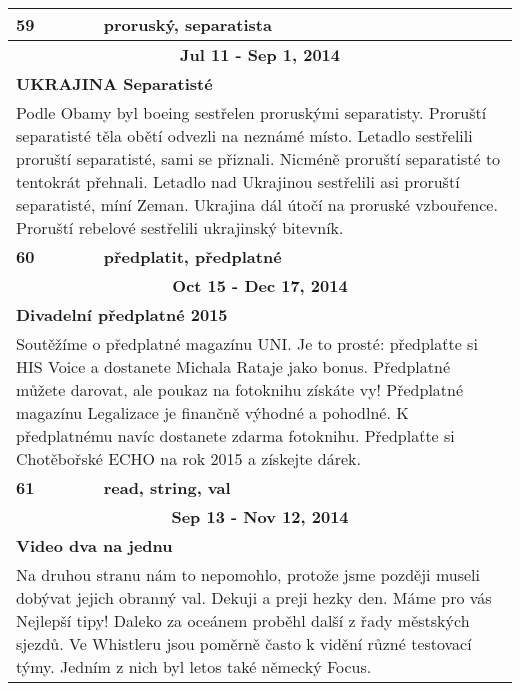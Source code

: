 \begin{tabularx}{\linewidth}{l l}
            \bf 59 & \bf proruský, separatista \\ \midrule
            
                \multicolumn{2}{c}{\bf Jul 11 - Sep 1, 2014} \\
                \multicolumn{2}{p{\linewidth}}{\bf UKRAJINA Separatisté} \\
                \multicolumn{2}{p{\linewidth}}{Podle Obamy byl boeing sestřelen proruskými separatisty. Proruští separatisté těla obětí odvezli na neznámé místo. Letadlo sestřelili proruští separatisté, sami se přiznali. Nicméně proruští separatisté to tentokrát přehnali. Letadlo nad Ukrajinou sestřelili asi proruští separatisté, míní Zeman. Ukrajina dál útočí na proruské vzbouřence. Proruští rebelové sestřelili ukrajinský bitevník.} \\ \midrule
                [1.5pt]

            \bf 60 & \bf předplatit, předplatné \\ \midrule
            
                \multicolumn{2}{c}{\bf Oct 15 - Dec 17, 2014} \\
                \multicolumn{2}{p{\linewidth}}{\bf Divadelní předplatné 2015} \\
                \multicolumn{2}{p{\linewidth}}{Soutěžíme o předplatné magazínu UNI. Je to prosté: předplaťte si HIS Voice a dostanete Michala Rataje jako bonus. Předplatné můžete darovat, ale poukaz na fotoknihu získáte vy! Předplatné magazínu Legalizace je finančně výhodné a pohodlné. K předplatnému navíc dostanete zdarma fotoknihu. Předplaťte si Chotěbořské ECHO na rok 2015 a získejte dárek.} \\ \midrule
                [1.5pt]

            \bf 61 & \bf read, string, val \\ \midrule
            
                \multicolumn{2}{c}{\bf Sep 13 - Nov 12, 2014} \\
                \multicolumn{2}{p{\linewidth}}{\bf Video dva na jednu} \\
                \multicolumn{2}{p{\linewidth}}{Na druhou stranu nám to nepomohlo, protože jsme později museli dobývat jejich obranný val. Dekuji a preji hezky den. Máme pro vás Nejlepší tipy! Daleko za oceánem proběhl další z řady městských sjezdů. Ve Whistleru jsou poměrně často k vidění různé testovací týmy. Jedním z nich byl letos také německý Focus.} \\ \midrule
                [1.5pt]


\end{tabularx}
